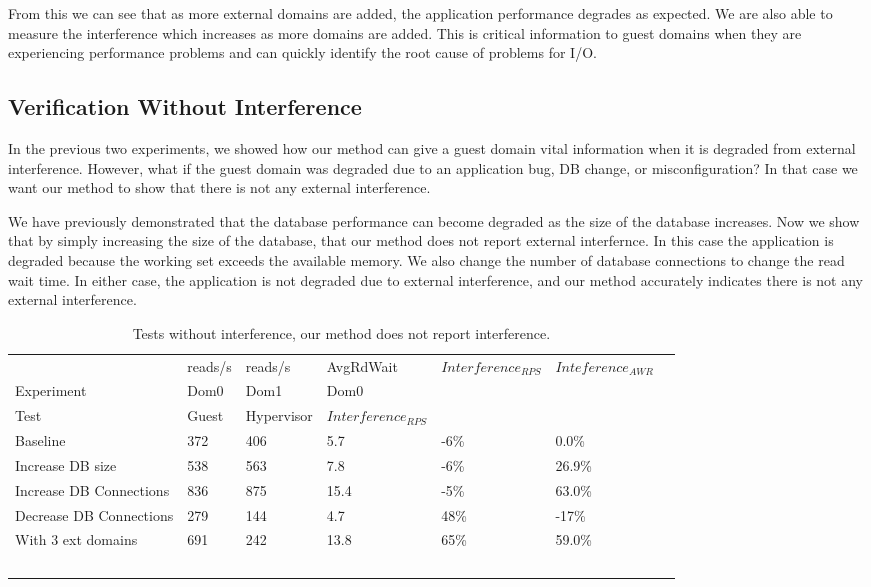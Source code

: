 From this we can see that as more external domains are added, the application performance degrades as expected.  We are also able to measure the interference which increases as more domains are added.  This is critical information to guest domains when they are experiencing performance problems and can quickly identify the root cause of problems for I/O.

\subsection{Verification Without Interference}
In the previous two experiments, we showed how our method can give a guest domain vital information when it is degraded from external interference.  However, what if the guest domain was degraded due to an application bug, DB change, or misconfiguration?   In that case we want our method to show that there is not any external interference.

We have previously demonstrated that the database performance can become degraded as the size of the database increases.  Now we show that by simply increasing the size of the database, that our method does not report external interfernce.  In this case the application is degraded because the working set exceeds the available memory.  We also change the number of database connections to change the read wait time.  In either case, the application is not degraded due to external interference, and our method accurately indicates there is not any external interference.

\begin{table}[h]
\begingroup
    \fontsize{10pt}{12pt}\selectfont
\begin{tabular}{ l l l l l l p{9cm} }
                   & reads/s & reads/s & AvgRdWait & $Interference_{RPS}$ & $Inteference_{AWR}$ \\
	Experiment     & Dom0     & Dom1     & Dom0      &                &             \\

    Test & Guest & Hypervisor  & $Interference_{RPS}$ \\
    \hline
    Baseline                   & 372 & 406 & 5.7 & -6\% & 0.0\%   \\  %
    Increase DB size           & 538 & 563 & 7.8 & -6\% & 26.9\% \\  %
    Increase DB Connections    & 836 & 875 &15.4 & -5\% & 63.0\% \\  %
	Decrease DB Connections    & 279 & 144 & 4.7 & 48\% & -17\%  \\  %
    With 3 ext domains         & 691 & 242 &13.8 & 65\% & 59.0\% \\  %
    \hline
  \end{tabular}
\caption{Tests without interference, our method does not report interference. }
\label{tab:HypervisorGuest}
\endgroup
\end{table}

